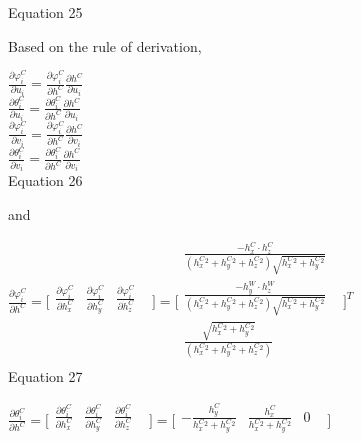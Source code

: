 Equation 25

Based on the rule of derivation, 

$\frac{\partial \varphi _{i}^{C}}{\partial u_{i}}=\frac{\partial 
\varphi _{i}^{C}}{\partial h^{C}}\frac{\partial h^{C}}{\partial u_{i}}$
\\


$\frac{\partial \theta _{i}^{C}}{\partial u_{i}}=\frac{\partial \theta 
_{i}^{C}}{\partial h^{C}}\frac{\partial h^{C}}{\partial u_{i}}$\\


$\frac{\partial \varphi _{i}^{C}}{\partial v_{i}}=\frac{\partial 
\varphi _{i}^{C}}{\partial h^{C}}\frac{\partial h^{C}}{\partial v_{i}}$
\\


$\frac{\partial \theta _{i}^{C}}{\partial v_{i}}=\frac{\partial \theta 
_{i}^{C}}{\partial h^{C}}\frac{\partial h^{C}}{\partial v_{i}}$\\


Equation 26

and

$\frac{\partial \varphi _{i}^{C}}{\partial h^{C}}=\lbrack 
\begin{matrix}
\frac{\partial \varphi _{i}^{C}}{\partial h_{x}^{C}} & \frac{\partial 
\varphi _{i}^{C}}{\partial h_{y}^{C}} & \frac{\partial \varphi 
_{i}^{C}}{\partial h_{z}^{C}} & \\
\end{matrix}
\rbrack =\lbrack \begin{matrix}
\frac{-h_{x}^{C}\cdot 
h_{z}^{C}}{(h_{x}^{C}^{2}+h_{y}^{C}^{2}+h_{z}^{C}^{2})\sqrt{h_{x}^{C}^{2}+h_{y}^{C}^{2}}} 
& \\
\frac{-h_{y}^{W}\cdot 
h_{z}^{W}}{(h_{x}^{C}^{2}+h_{y}^{C}^{2}+h_{z}^{C}^{2})\sqrt{h_{x}^{C}^{2}+h_{y}^{C}^{2}}} 
& \\

\frac{\sqrt{h_{x}^{C}^{2}+h_{y}^{C}^{2}}}{(h_{x}^{C}^{2}+h_{y}^{C}^{2}+h_{z}^{C}^{2})} 
& \\
\end{matrix}
\rbrack ^{T}$\\


Equation 27

$\frac{\partial \theta _{i}^{C}}{\partial h^{C}}=\lbrack \begin{matrix}
\frac{\partial \theta _{i}^{C}}{\partial h_{x}^{C}} & \frac{\partial 
\theta _{i}^{C}}{\partial h_{y}^{C}} & \frac{\partial \theta 
_{i}^{C}}{\partial h_{z}^{C}} & \\
\end{matrix}
\rbrack =\lbrack \begin{matrix}
-\frac{h_{y}^{C}}{h_{x}^{C}^{2}+h_{y}^{C}^{2}} & 
\frac{h_{x}^{C}}{h_{x}^{C}^{2}+h_{y}^{C}^{2}} & 0 & \\
\end{matrix}
\rbrack $\\


